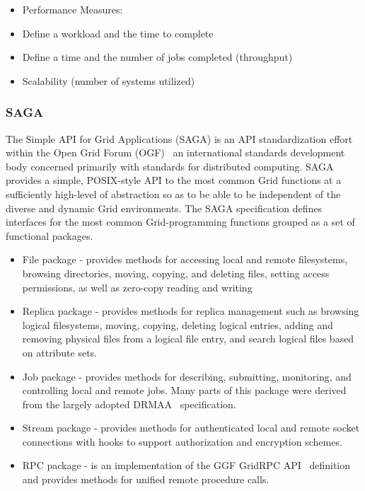\documentclass[conference,final]{IEEEtran}
\begin{document}
\begin{itemize}
\item Performance Measures:
\item Define a workload and the time to complete 
\item Define a time and the number of jobs completed (throughput)
\item Scalability (number of systems utilized)
\end{itemize} 

\subsubsection{SAGA}

The Simple API for Grid Applications (SAGA) is an API standardization
effort within the Open Grid Forum (OGF)~\cite{ogf_web} an
international standards development body concerned primarily with
standards for distributed computing.  SAGA provides a simple,
POSIX-style API to the most common Grid functions at a sufficiently
high-level of abstraction so as to be able to be independent of the
diverse and dynamic Grid environments. The SAGA specification defines
interfaces for the most common Grid-programming functions grouped as a
set of functional packages.

\begin{itemize}
\item File package - provides methods for accessing local and remote
  filesystems, browsing directories, moving, copying, and deleting
  files, setting access permissions, as well as zero-copy reading and
  writing
\item Replica package - provides methods for replica management such
  as browsing logical filesystems, moving, copying, deleting logical
  entries, adding and removing physical files from a logical file
  entry, and search logical files based on attribute sets.
\item Job package - provides methods for describing, submitting,
  monitoring, and controlling local and remote jobs. Many parts of
  this package were derived from the largely adopted
  DRMAA~\cite{drmaa_url} specification.
\item Stream package - provides methods for authenticated local and
  remote socket connections with hooks to support authorization and
  encryption schemes.
\item RPC package - is an implementation of the GGF GridRPC
  API~\cite{gridrpc_url} definition and provides methods for unified
  remote procedure calls.
\end{itemize}
\end{document}
